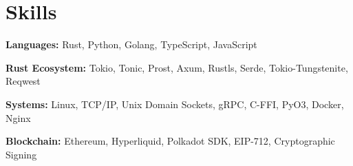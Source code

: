 \documentclass[11pt,a4paper,sans]{moderncv}
\begin{document}

\section{Skills}

{
  \textbf{Languages:}
  Rust, Python, Golang, TypeScript, JavaScript

  \vspace{2mm}


  \vspace{2mm}

  \textbf{Rust Ecosystem:}
  Tokio, Tonic, Prost, Axum, Rustls, Serde, Tokio-Tungstenite, Reqwest %

  \vspace{2mm}

  \textbf{Systems:}
  Linux, TCP/IP, Unix Domain Sockets, gRPC, C-FFI, PyO3, Docker, Nginx

  \vspace{2mm}

  \textbf{Blockchain:}
  Ethereum, Hyperliquid, Polkadot SDK, EIP-712, Cryptographic Signing
}
\end{document}
